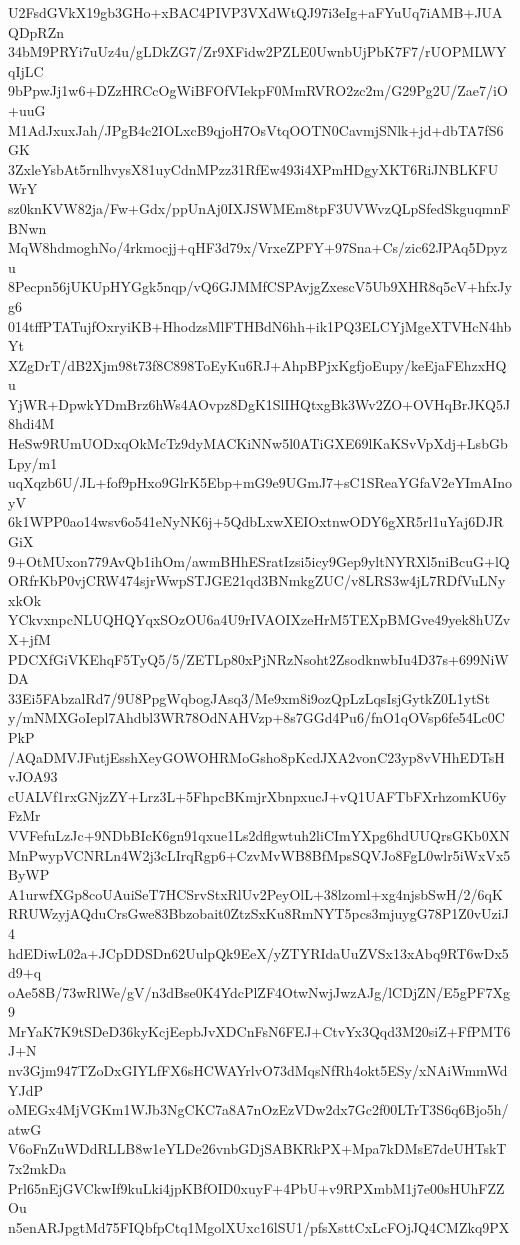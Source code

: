 U2FsdGVkX19gb3GHo+xBAC4PIVP3VXdWtQJ97i3eIg+aFYuUq7iAMB+JUAQDpRZn
34bM9PRYi7uUz4u/gLDkZG7/Zr9XFidw2PZLE0UwnbUjPbK7F7/rUOPMLWYqIjLC
9bPpwJj1w6+DZzHRCcOgWiBFOfVIekpF0MmRVRO2zc2m/G29Pg2U/Zae7/iO+uuG
M1AdJxuxJah/JPgB4c2IOLxcB9qjoH7OsVtqOOTN0CavmjSNlk+jd+dbTA7fS6GK
3ZxleYsbAt5rnlhvysX81uyCdnMPzz31RfEw493i4XPmHDgyXKT6RiJNBLKFUWrY
sz0knKVW82ja/Fw+Gdx/ppUnAj0IXJSWMEm8tpF3UVWvzQLpSfedSkguqmnFBNwn
MqW8hdmoghNo/4rkmocjj+qHF3d79x/VrxeZPFY+97Sna+Cs/zic62JPAq5Dpyzu
8Pecpn56jUKUpHYGgk5nqp/vQ6GJMMfCSPAvjgZxescV5Ub9XHR8q5cV+hfxJyg6
014tffPTATujfOxryiKB+HhodzsMlFTHBdN6hh+ik1PQ3ELCYjMgeXTVHcN4hbYt
XZgDrT/dB2Xjm98t73f8C898ToEyKu6RJ+AhpBPjxKgfjoEupy/keEjaFEhzxHQu
YjWR+DpwkYDmBrz6hWs4AOvpz8DgK1SlIHQtxgBk3Wv2ZO+OVHqBrJKQ5J8hdi4M
HeSw9RUmUODxqOkMcTz9dyMACKiNNw5l0ATiGXE69lKaKSvVpXdj+LsbGbLpy/m1
uqXqzb6U/JL+fof9pHxo9GlrK5Ebp+mG9e9UGmJ7+sC1SReaYGfaV2eYImAInoyV
6k1WPP0ao14wsv6o541eNyNK6j+5QdbLxwXEIOxtnwODY6gXR5rl1uYaj6DJRGiX
9+OtMUxon779AvQb1ihOm/awmBHhESratIzsi5icy9Gep9yltNYRXl5niBcuG+lQ
ORfrKbP0vjCRW474sjrWwpSTJGE21qd3BNmkgZUC/v8LRS3w4jL7RDfVuLNyxkOk
YCkvxnpcNLUQHQYqxSOzOU6a4U9rIVAOIXzeHrM5TEXpBMGve49yek8hUZvX+jfM
PDCXfGiVKEhqF5TyQ5/5/ZETLp80xPjNRzNsoht2ZsodknwbIu4D37s+699NiWDA
33Ei5FAbzalRd7/9U8PpgWqbogJAsq3/Me9xm8i9ozQpLzLqsIsjGytkZ0L1ytSt
y/mNMXGoIepl7Ahdbl3WR78OdNAHVzp+8s7GGd4Pu6/fnO1qOVsp6fe54Lc0CPkP
/AQaDMVJFutjEsshXeyGOWOHRMoGsho8pKcdJXA2vonC23yp8vVHhEDTsHvJOA93
cUALVf1rxGNjzZY+Lrz3L+5FhpcBKmjrXbnpxucJ+vQ1UAFTbFXrhzomKU6yFzMr
VVFefuLzJc+9NDbBIcK6gn91qxue1Ls2dflgwtuh2liCImYXpg6hdUUQrsGKb0XN
MnPwypVCNRLn4W2j3cLIrqRgp6+CzvMvWB8BfMpsSQVJo8FgL0wlr5iWxVx5ByWP
A1urwfXGp8coUAuiSeT7HCSrvStxRlUv2PeyOlL+38lzoml+xg4njsbSwH/2/6qK
RRUWzyjAQduCrsGwe83Bbzobait0ZtzSxKu8RmNYT5pcs3mjuygG78P1Z0vUziJ4
hdEDiwL02a+JCpDDSDn62UulpQk9EeX/yZTYRIdaUuZVSx13xAbq9RT6wDx5d9+q
oAe58B/73wRlWe/gV/n3dBse0K4YdcPlZF4OtwNwjJwzAJg/lCDjZN/E5gPF7Xg9
MrYaK7K9tSDeD36kyKcjEepbJvXDCnFsN6FEJ+CtvYx3Qqd3M20siZ+FfPMT6J+N
nv3Gjm947TZoDxGIYLfFX6sHCWAYrlvO73dMqsNfRh4okt5ESy/xNAiWmmWdYJdP
oMEGx4MjVGKm1WJb3NgCKC7a8A7nOzEzVDw2dx7Gc2f00LTrT3S6q6Bjo5h/atwG
V6oFnZuWDdRLLB8w1eYLDe26vnbGDjSABKRkPX+Mpa7kDMsE7deUHTskT7x2mkDa
Prl65nEjGVCkwIf9kuLki4jpKBfOID0xuyF+4PbU+v9RPXmbM1j7e00sHUhFZZOu
n5enARJpgtMd75FIQbfpCtq1MgolXUxc16lSU1/pfsXsttCxLcFOjJQ4CMZkq9PX
